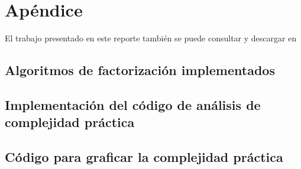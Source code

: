 \documentclass{article}
\begin{document}
\pagebreak
\section{Apéndice}

El trabajo presentado en este reporte también se puede consultar y descargar en 

\subsection{Algoritmos de factorización implementados} \label{sec:algoritmos}



\pagebreak

\subsection{Implementación del código de análisis de complejidad práctica} \label{sec:complejidad}



\pagebreak
\subsection{Código para graficar la complejidad práctica} \label{sec:grafica}


\end{document}
